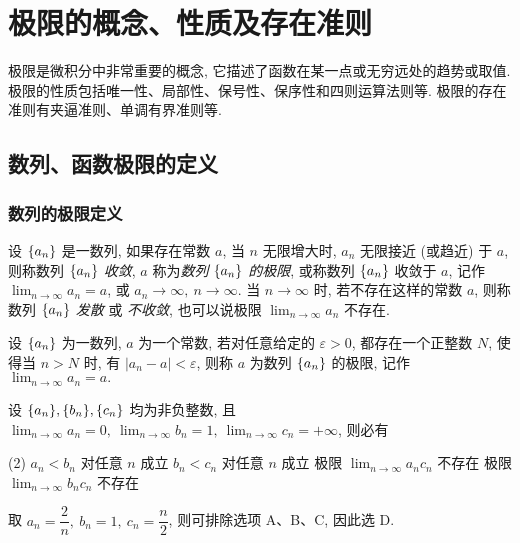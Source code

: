 \section{极限的概念、性质及存在准则}

极限是微积分中非常重要的概念, 它描述了函数在某一点或无穷远处的趋势或取值. 极限的性质包括唯一性、局部性、保号性、保序性和四则运算法则等. 极限的存在准则有夹逼准则、单调有界准则等. 

\subsection{数列、函数极限的定义}

\subsubsection{数列的极限定义}

\begin{definition}[数列极限 A]
    设 $\qty{a_n}$ 是一数列, 如果存在常数 $a$, 当 $n$ 无限增大时, $a_n$ 无限接近 (或趋近) 于 $a$, 则称数列 $\qty{a_n}$ \textit{收敛}, $a$ 称为\textit{数列} $\qty{a_n}$ \textit{的极限}, 
    或称数列 $\qty{a_n}$ 收敛于 $a$, 记作 $\displaystyle\lim_{n\to\infty}a_n=a$, 或 $a_n\to\infty,~n\to\infty$.
    当 $n\to\infty$ 时, 若不存在这样的常数 $a$, 则称数列 $\qty{a_n}$ \textit{发散} 或 \textit{不收敛}, 也可以说极限 $\displaystyle\lim_{n\to\infty}a_n$ 不存在.
\end{definition}

\begin{definition}[数列极限 B]
    设 $\qty{a_n}$ 为一数列, $a$ 为一个常数, 若对任意给定的 $\varepsilon>0$, 都存在一个正整数 $N$, 使得当 $n>N$ 时, 有 $|a_n-a|<\varepsilon$, 则称 $a$ 为数列 $\qty{a_n}$ 的极限, 记作 $\displaystyle\lim_{n\to\infty}a_n=a.$
\end{definition}

\begin{example}[2003 数一]
    设 $\qty{a_n},\qty{b_n},\qty{c_n}$ 均为非负整数, 且 $\displaystyle\lim_{n\to\infty}a_n=0,~\lim_{n\to\infty}b_n=1,~\lim_{n\to\infty}c_n=+\infty$, 则必有
    \begin{tasks}(2)
        \task $a_n<b_n$ 对任意 $n$ 成立
        \task $b_n<c_n$ 对任意 $n$ 成立
        \task 极限 $\displaystyle\lim_{n\to\infty}a_nc_n$ 不存在
        \task 极限 $\displaystyle\lim_{n\to\infty}b_nc_n$ 不存在
    \end{tasks}
\end{example}
\begin{solution}
    取 $a_n=\dfrac{2}{n},~b_n=1,~c_n=\dfrac{n}{2}$, 则可排除选项 A、B、C, 因此选 D.
\end{solution}

